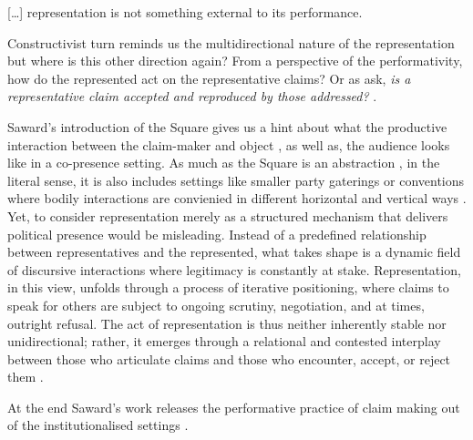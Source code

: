 \epigraph{[\ldots] representation is not something external to its performance.}{\cite[302]{saward2010}}

Constructivist turn \parencite[]{disch2015}  reminds us the multidirectional nature of the representation but where is this other direction again?
From a perspective of the performativity, how do the represented act on the representative claims?
Or as \cite{kim2024} ask, \textit{is a representative claim accepted and reproduced by those addressed?} \parencite[4]{kim2024}.

Saward's introduction of the Square gives us a hint about what the productive interaction
between the claim-maker and object
, as well as, the audience looks like in a
co-presence setting. As much as the Square is an abstraction , in the
literal sense, it is also includes settings like smaller party gaterings or
conventions where bodily interactions are convienied in different horizontal
and vertical ways \parencite[see 4]{kim2024}. Yet, to consider representation merely as a structured mechanism that delivers political presence would be misleading. Instead of a predefined relationship between representatives and the represented, what takes shape is a dynamic field of discursive interactions where legitimacy is constantly at stake. Representation, in this view, unfolds through a process of iterative positioning, where claims to speak for others are subject to ongoing scrutiny, negotiation, and at times, outright refusal. The act of representation is thus neither inherently stable nor unidirectional; rather, it emerges through a relational and contested interplay between those who articulate claims and those who encounter, accept, or reject them \parencite[see 6]{kim2024}.

At the end Saward's work releases the performative practice of claim making out
of the institutionalised settings \parencite[4]{kim2024}.




